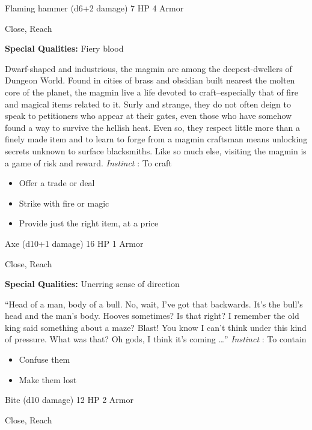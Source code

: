 

 Flaming hammer (d6+2 damage) 7 HP 4 Armor


 Close, Reach


 \textbf{Special Qualities:}
 Fiery blood


 Dwarf-shaped and industrious, the magmin are among the deepest-dwellers of Dungeon World. Found in cities of brass and obsidian built nearest the molten core of the planet, the magmin live a life devoted to craft--especially that of fire and magical items related to it. Surly and strange, they do not often deign to speak to petitioners who appear at their gates, even those who have somehow found a way to survive the hellish heat. Even so, they respect little more than a finely made item and to learn to forge from a magmin craftsman means unlocking secrets unknown to surface blacksmiths. Like so much else, visiting the magmin is a game of risk and reward. \emph{Instinct}
: To craft
\begin{itemize}
\item Offer a trade or deal
\item Strike with fire or magic
\item Provide just the right item, at a price

\end{itemize}




 Axe (d10+1 damage) 16 HP 1 Armor


 Close, Reach


 \textbf{Special Qualities:}
 Unerring sense of direction


 ``Head of a man, body of a bull. No, wait, I've got that backwards. It's the bull's head and the man's body. Hooves sometimes? Is that right? I remember the old king said something about a maze? Blast! You know I can't think under this kind of pressure. What was that? Oh gods, I think it's coming \ldots '' \emph{Instinct}
: To contain
\begin{itemize}
\item Confuse them
\item Make them lost

\end{itemize}




 Bite (d10 damage) 12 HP 2 Armor


 Close, Reach


